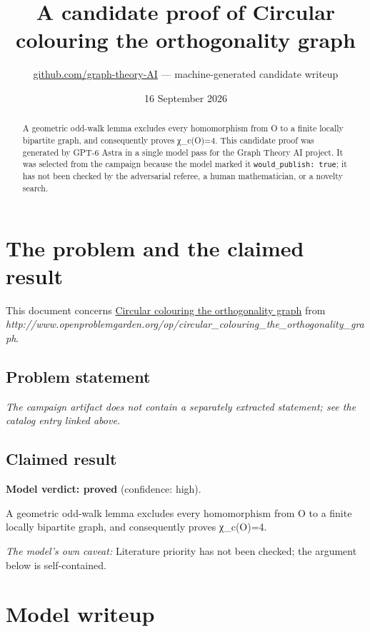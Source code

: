 \documentclass[
  11pt,
  a4paper,
]{article}
\title{A candidate proof of Circular colouring the orthogonality graph}
\author{\href{https://github.com/graph-theory-AI}{github.com/graph-theory-AI}
--- machine-generated candidate writeup}
\date{16 September 2026}
\begin{document}
\maketitle
\begin{abstract}
A geometric odd-walk lemma excludes every homomorphism from O to a
finite locally bipartite graph, and consequently proves χ\_c(O)=4. This
candidate proof was generated by GPT-6 Astra in a single model pass for
the Graph Theory AI project. It was selected from the campaign because
the model marked it \texttt{would\_publish:\ true}; it has not been
checked by the adversarial referee, a human mathematician, or a novelty
search.
\end{abstract}

\section{The problem and the claimed
result}\label{the-problem-and-the-claimed-result}

This document concerns
\href{https://graph-theory-ai.github.io/graph-conjectures/op/circular_colouring_the_orthogonality_graph/}{Circular
colouring the orthogonality graph} from
\emph{http://www.openproblemgarden.org/op/circular\_colouring\_the\_orthogonality\_graph}.

\subsection{Problem statement}\label{problem-statement}

\emph{The campaign artifact does not contain a separately extracted
statement; see the catalog entry linked above.}

\subsection{Claimed result}\label{claimed-result}

\textbf{Model verdict: proved} (confidence: high).

A geometric odd-walk lemma excludes every homomorphism from O to a
finite locally bipartite graph, and consequently proves χ\_c(O)=4.

\emph{The model's own caveat:} Literature priority has not been checked;
the argument below is self-contained.

\section{Model writeup}\label{model-writeup}
\end{document}
